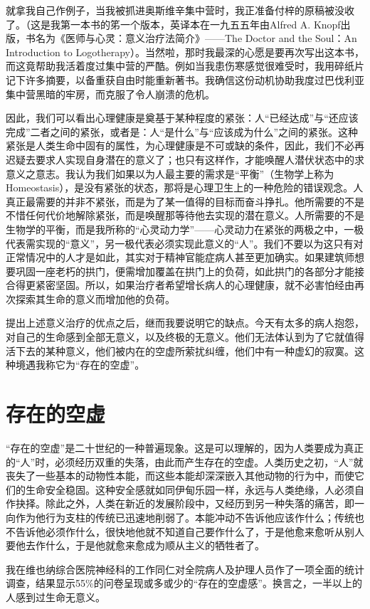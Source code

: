 \documentclass[11pt,oneside]{book}
\begin{document}
\begin{common-format}
就拿我自己作例子，当我被抓进奥斯维辛集中营时，我正准备付梓的原稿被没收了。（这是我第一本书的笫一个版本，英译本在一九五五年由Alfred A. Knopf出版，书名为《医师与心灵：意义治疗法简介》——The Doctor and the Soul：An Introduction to Logotherapy）。当然啦，那时我最深的心愿是要再次写出这本书，而这竟帮助我活着度过集中营的严酷。例如当我患伤寒感觉很难受时，我用碎纸片记下许多摘要，以备重获自由时能重新著书。我确信这份动机协助我度过巴伐利亚集中营黑暗的牢房，而克服了令人崩溃的危机。

因此，我们可以看出心理健康是奠基于某种程度的紧张：人“已经达成”与“还应该完成”二者之间的紧张，或者是：人“是什么”与“应该成为什么”之间的紧张。这种紧张是人类生命中固有的属性，为心理健康是不可或缺的条件，因此，我们不必再迟疑去要求人实现自身潜在的意义了；也只有这样作，才能唤醒人潜伏状态中的求意义之意志。我认为我们如果以为人最主要的需求是“平衡”（生物学上称为Homeostasis），是没有紧张的状态，那将是心理卫生上的一种危险的错误观念。人真正最需要的并非不紧张，而是为了某一值得的目标而奋斗挣扎。他所需要的不是不惜任何代价地解除紧张，而是唤醒那等待他去实现的潜在意义。人所需要的不是生物学的平衡，而是我所称的“心灵动力学”——心灵动力在紧张的两极之中，一极代表需实现的“意义”，另一极代表必须实现此意义的“人”。我们不要以为这只有对正常情况中的人才是如此，其实对于精神官能症病人甚至更加确实。如果建筑师想要巩固一座老朽的拱门，便需增加覆盖在拱门上的负荷，如此拱门的各部分才能接合得更紧密坚固。所以，如果治疗者希望增长病人的心理健康，就不必害怕经由再次探索其生命的意义而增加他的负荷。

提出上述意义治疗的优点之后，继而我要说明它的缺点。今天有太多的病人抱怨，对自己的生命感到全部无意义，以及终极的无意义。他们无法体认到为了它就值得活下去的某种意义，他们被内在的空虚所萦扰纠缠，他们中有一种虚幻的寂寞。这种境遇我称它为“存在的空虚”。


\section{存在的空虚}
“存在的空虚”是二十世纪的一种普遍现象。这是可以理解的，因为人类要成为真正的“人”时，必须经历双重的失落，由此而产生存在的空虚。人类历史之初，“人”就丧失了一些基本的动物性本能，而这些本能却深深嵌入其他动物的行为中，而使它们的生命安全稳固。这种安全感就如同伊甸乐园一样，永远与人类绝缘，人必须自作抉择。除此之外，人类在新近的发展阶段中，又经历到另一种失落的痛苦，即一向作为他行为支柱的传统已迅速地削弱了。本能冲动不告诉他应该作什么；传统也不告诉他必须作什么，很快地他就不知道自己要作什么了，于是他愈来愈听从别人要他去作什么，于是他就愈来愈成为顺从主义的牺牲者了。

我在维也纳综合医院神经科的工作同仁对全院病人及护理人员作了一项全面的统计调查，结果显示55\%{}的问卷呈现或多或少的“存在的空虚感”。换言之，一半以上的人感到过生命无意义。


\end{common-format}
\end{document}
